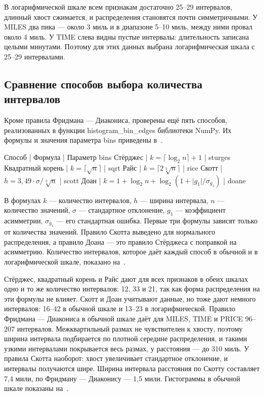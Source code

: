 \documentclass[a4paper,14pt]{extarticle}
\begin{document}
В логарифмической шкале всем признакам достаточно 25–29 интервалов, длинный хвост сжимается, и распределения становятся почти симметричными. У MILES два пика — около 3 миль и в диапазоне 5–10 миль, между ними провал около 4 миль. У TIME слева видны пустые интервалы: длительность записана целыми минутами. Поэтому для этих данных выбрана логарифмическая шкала с 25–29 интервалами.

\subsection{Сравнение способов выбора количества интервалов}

Кроме правила Фридмана — Диакониса, проверены ещё пять способов, реализованных в функции histogram\_bin\_edges библиотеки NumPy. Их формулы и значения параметра bins приведены в~.

Способ | Формула | Параметр bins
Стёрджес | $k = \lceil \log_2 n \rceil + 1$ | sturges
Квадратный корень | $k = \lceil \sqrt{n} \rceil$ | sqrt
Райс | $k = \lceil 2 \sqrt[3]{n} \rceil$ | rice
Скотт | $h = 3{,}49 \cdot \sigma / \sqrt[3]{n}$ | scott
Доан | $k = 1 + \log_2 n + \log_2 (1 + \lvert g_1 \rvert / \sigma_{g_1})$ | doane

В формулах $k$ — количество интервалов, $h$ — ширина интервала, $n$ — количество значений, $\sigma$ — стандартное отклонение, $g_1$ — коэффициент асимметрии, $\sigma_{g_1}$ — его стандартная ошибка. Первые три формулы зависят только от количества значений. Правило Скотта выведено для нормального распределения, а правило Доана — это правило Стёрджеса с поправкой на асимметрию. Количество интервалов, которое даёт каждый способ в обычной и в логарифмической шкале, показано на~.


Стёрджес, квадратный корень и Райс дают для всех признаков в обеих шкалах одно и то же количество интервалов: 12, 33 и 21, так как форма распределения на эти формулы не влияет. Скотт и Доан учитывают данные, но тоже дают немного интервалов: 16–42 в обычной шкале и 13–23 в логарифмической. Правило Фридмана — Диакониса в обычной шкале даёт для MILES, TIME и PRICE 96–207 интервалов. Межквартильный размах не чувствителен к хвосту, поэтому ширина интервала подбирается по плотной середине распределения, и такими узкими интервалами покрывается весь размах, у расстояния — до 310 миль. У правила Скотта наоборот: хвост увеличивает стандартное отклонение, и интервалы получаются шире. Ширина интервала расстояния по Скотту составляет 7,4 мили, по Фридману — Диаконису — 1,5 мили. Гистограммы в обычной шкале показаны на~.
\end{document}
